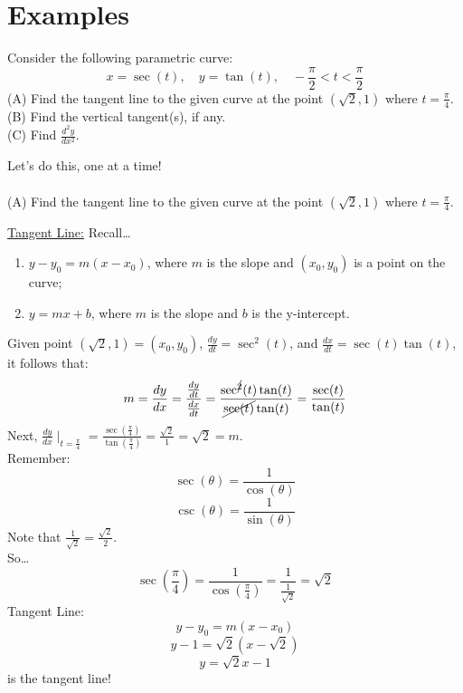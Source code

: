 \documentclass{article}
\begin{document}
\section*{Examples}
\begin{examplebox}
Consider the following parametric curve:
\[
    x = \sec(t), \quad y = \tan(t), \quad -\frac{\pi}{2} < t < \frac{\pi}{2}
\]
(A) Find the tangent line to the given curve at the point \( (\sqrt{2}, 1) \) where \( t = \frac{\pi}{4} \). \\
(B) Find the vertical tangent(s), if any. \\
(C) Find \( \frac{d^2y}{dx^2} \).
\end{examplebox}
Let's do this, one at a time! \\
\\
(A) Find the tangent line to the given curve at the point \( (\sqrt{2}, 1) \) where \( t = \frac{\pi}{4} \).
\begin{examplebox}
\underline{Tangent Line:}
Recall\dots
\begin{enumerate}
    \item \( y - y_0 = m(x - x_0) \), where \( m \) is the slope and \( (x_0, y_0) \) is a point on the curve;
    \item \( y = mx + b \), where \( m \) is the slope and \( b \) is the y-intercept.
\end{enumerate}
Given point \( (\sqrt{2}, 1) = (x_0, y_0) \), \( \frac{dy}{dt} = \sec^2(t) \), and \( \frac{dx}{dt} = \sec(t)\tan(t) \), it follows that:
\[
    m = \frac{dy}{dx} = \frac{\frac{dy}{dt}}{\frac{dx}{dt}} = \frac{\sec^{\cancel{2}}(t)\tan(t)}{\cancel{\sec(t)}\tan(t)} = \frac{\sec(t)}{\tan(t)}
\]
Next, \( \frac{dy}{dx} \mid_{t = \frac{\pi}{4}} = \frac{\sec(\frac{\pi}{4})}{\tan(\frac{\pi}{4})} = \frac{\sqrt{2}}{1} = \sqrt{2} = m \). \\

Remember:
\[
    \sec(\theta) = \frac{1}{\cos(\theta)}
\]
\[
    \csc(\theta) = \frac{1}{\sin(\theta)}
\]
Note that \( \frac{1}{\sqrt{2}} = \frac{\sqrt{2}}{2} \). \\
So\dots
\[
    \sec(\frac{\pi}{4}) = \frac{1}{\cos(\frac{\pi}{4})} = \frac{1}{\frac{1}{\sqrt{2}}} = \sqrt{2}
\]
Tangent Line:
\[
    y - y_0 = m(x - x_0)
\]
\[
    y - 1 = \sqrt{2} (x - \sqrt{2})
\]
\[
    y = \sqrt{2}x - 1
\]
is the tangent line!

\end{examplebox}
\end{document}
